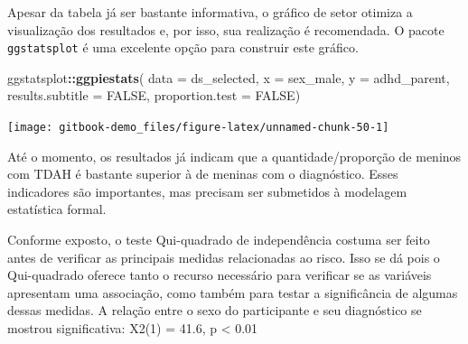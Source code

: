 \documentclass[
]{book}
\newenvironment{Shaded}{\begin{snugshade}}{\end{snugshade}}
\newcommand{\DataTypeTok}[1]{\textcolor[rgb]{0.13,0.29,0.53}{#1}}
\newcommand{\KeywordTok}[1]{\textcolor[rgb]{0.13,0.29,0.53}{\textbf{#1}}}
\newcommand{\NormalTok}[1]{#1}
\newcommand{\OperatorTok}[1]{\textcolor[rgb]{0.81,0.36,0.00}{\textbf{#1}}}
\newcommand{\OtherTok}[1]{\textcolor[rgb]{0.56,0.35,0.01}{#1}}
\newcommand{\StringTok}[1]{\textcolor[rgb]{0.31,0.60,0.02}{#1}}
\begin{document}
Apesar da tabela já ser bastante informativa, o gráfico de setor otimiza a visualização dos resultados e, por isso, sua realização é recomendada. O pacote \texttt{ggstatsplot} é uma excelente opção para construir este gráfico.

\begin{Shaded}
\begin{Highlighting}[]
\NormalTok{ggstatsplot}\OperatorTok{::}\KeywordTok{ggpiestats}\NormalTok{(}
    \DataTypeTok{data =}\NormalTok{ ds_selected,}
    \DataTypeTok{x =}\NormalTok{ sex_male,}
    \DataTypeTok{y =}\NormalTok{ adhd_parent, }
    \DataTypeTok{results.subtitle =} \OtherTok{FALSE}\NormalTok{, }
    \DataTypeTok{proportion.test =} \OtherTok{FALSE}\NormalTok{)}
\end{Highlighting}
\end{Shaded}

\begin{center}\texttt{[image: gitbook-demo\_files/figure-latex/unnamed-chunk-50-1]} \end{center}

Até o momento, os resultados já indicam que a quantidade/proporção de meninos com TDAH é bastante superior à de meninas com o diagnóstico. Esses indicadores são importantes, mas precisam ser submetidos à modelagem estatística formal.

Conforme exposto, o teste Qui-quadrado de independência costuma ser feito antes de verificar as principais medidas relacionadas ao risco. Isso se dá pois o Qui-quadrado oferece tanto o recurso necessário para verificar se as variáveis apresentam uma associação, como também para testar a significância de algumas dessas medidas. A relação entre o sexo do participante e seu diagnóstico se mostrou significativa: X2(1) = 41.6, p \textless{} 0.01

\begin{Shaded}
\end{Shaded}
\end{document}
